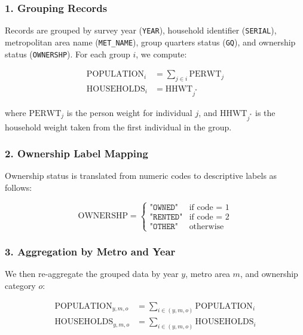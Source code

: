 \documentclass[APA,Times1COL]{WileyNJDv5} %
\begin{document}
\subsubsection*{1. Grouping Records}

Records are grouped by survey year (\texttt{YEAR}), household identifier (\texttt{SERIAL}), metropolitan area name (\texttt{MET\_NAME}), group quarters status (\texttt{GQ}), and ownership status (\texttt{OWNERSHP}). For each group \( i \), we compute:

\begin{align}
	\text{POPULATION}_{i} &= \sum_{j \in i} \text{PERWT}_{j} \\
	\text{HOUSEHOLDS}_{i} &= \text{HHWT}_{j^*}
\end{align}

where \( \text{PERWT}_j \) is the person weight for individual \( j \), and \( \text{HHWT}_{j^*} \) is the household weight taken from the first individual in the group.

\subsubsection*{2. Ownership Label Mapping}

Ownership status is translated from numeric codes to descriptive labels as follows:

\begin{equation}
	\text{OWNERSHP} =
	\begin{cases}
		\texttt{"OWNED"} & \text{if code = 1} \\
		\texttt{"RENTED"} & \text{if code = 2} \\
		\texttt{"OTHER"} & \text{otherwise}
	\end{cases}
\end{equation}

\subsubsection*{3. Aggregation by Metro and Year}

We then re-aggregate the grouped data by year \( y \), metro area \( m \), and ownership category \( o \):

\begin{align}
	\text{POPULATION}_{y,m,o} &= \sum_{i \in (y,m,o)} \text{POPULATION}_i \\
	\text{HOUSEHOLDS}_{y,m,o} &= \sum_{i \in (y,m,o)} \text{HOUSEHOLDS}_i
\end{align}
\end{document}
